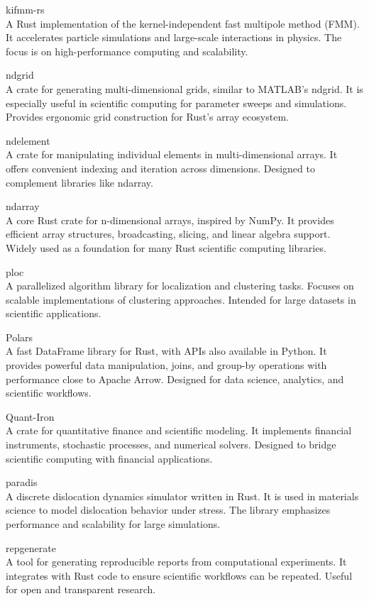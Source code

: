 \documentclass{article}
\begin{document}
kifmm-rs\\
A Rust implementation of the kernel-independent fast multipole method (FMM). It
accelerates particle simulations and large-scale interactions in physics. The focus is on
high-performance computing and scalability.

ndgrid\\
A crate for generating multi-dimensional grids, similar to MATLAB’s ndgrid. It is
especially useful in scientific computing for parameter sweeps and simulations. Provides ergonomic
grid construction for Rust’s array ecosystem.

ndelement\\
A crate for manipulating individual elements in multi-dimensional arrays. It offers
convenient indexing and iteration across dimensions. Designed to complement libraries like ndarray.

ndarray\\
A core Rust crate for n-dimensional arrays, inspired by NumPy. It provides efficient
array structures, broadcasting, slicing, and linear algebra support. Widely used as a foundation
for many Rust scientific computing libraries.

ploc\\
A parallelized algorithm library for localization and clustering tasks. Focuses on scalable
implementations of clustering approaches. Intended for large datasets in scientific applications.

Polars\\
A fast DataFrame library for Rust, with APIs also available in Python. It provides
powerful data manipulation, joins, and group-by operations with performance close to Apache Arrow.
Designed for data science, analytics, and scientific workflows.

Quant-Iron\\
A crate for quantitative finance and scientific modeling. It implements financial
instruments, stochastic processes, and numerical solvers. Designed to bridge scientific computing
with financial applications.

paradis\\
A discrete dislocation dynamics simulator written in Rust. It is used in materials
science to model dislocation behavior under stress. The library emphasizes performance and
scalability for large simulations.

repgenerate\\
A tool for generating reproducible reports from computational experiments. It
integrates with Rust code to ensure scientific workflows can be repeated. Useful for open and
transparent research.
\end{document}
